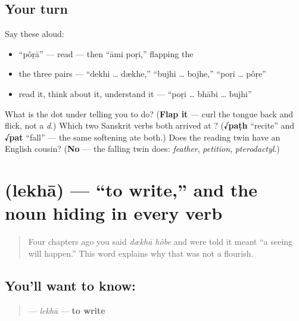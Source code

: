 \subsection*{Your turn}
Say these aloud:

\begin{itemize}
\raggedright
  \item \textquotedblleft{}pôṛā\textquotedblright{} — read — then \textquotedblleft{}āmi poṛi,\textquotedblright{} flapping the 
  \item the three pairs — \textquotedblleft{}dekhi … dækhe,\textquotedblright{} \textquotedblleft{}bujhi … bojhe,\textquotedblright{} \textquotedblleft{}poṛi … pôṛe\textquotedblright{}
  \item read it, think about it, understand it — \textquotedblleft{}poṛi … bhābi … bujhi\textquotedblright{}
\end{itemize}

\begin{tcolorbox}[breakable,colback=teal!4,colframe=teal!35!black,title={Before you move on}]
What is the dot under \textbf{} telling you to do? (\textbf{Flap it} — curl the tongue back and flick, not a \emph{d}.) Which two Sanskrit verbs both arrived at ? (\textbf{√paṭh} \textquotedblleft{}recite\textquotedblright{} and \textbf{√pat} \textquotedblleft{}fall\textquotedblright{} — the same softening ate both.) Does the reading twin have an English cousin? (\textbf{No} — the falling twin does: \emph{feather}, \emph{petition}, \emph{pterodactyl}.)
\end{tcolorbox}
\section[lekhā]{ (lekhā) — \textquotedblleft{}to write,\textquotedblright{} and the noun hiding in every verb}

\label{lesson:BN-C08-lekha}



\begin{quote}
Four chapters ago you said \emph{dækhā hôbe} and were told it meant \textquotedblleft{}a seeing will happen.\textquotedblright{} This word explains why that was not a flourish.
\end{quote}

\subsection*{You'll want to know: }
\begin{quote}
\textbf{} — \emph{lekhā} — \textbf{to write}
\end{quote}

